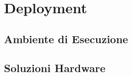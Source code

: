 \section{Deployment}
\label{sec:deployment}

\subsection{Ambiente di Esecuzione}
\label{sec:ambiente-esecuzione}

\subsection{Soluzioni Hardware}
\label{sec:soluzioni-hardware}
